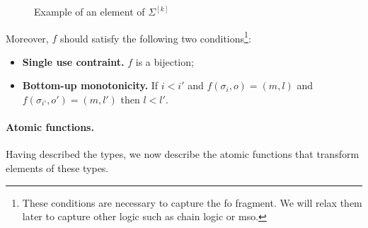 \begin{definition}[Types]
\begin{itemize}
\begin{enumerate}
\begin{figure}

\caption{Example of an element of $\Sigma^{[k]}$\label{FigMatrixPower}}
\end{figure}

Moreover, $f$ should satisfy the following two conditions\footnote{These conditions are necessary to capture the fo fragment. We will relax them later to capture other logic such as chain logic or mso.}:
\begin{itemize}
\item {\bf Single use contraint.} $f$ is a bijection;
\item  {\bf Bottom-up monotonicity.} If $i<i'$ and $f(\sigma_i, o)=(m,l)$ and $f(\sigma_{i'},o')=(m,l')$ then $l<l'$. 
\end{itemize}

%
    \end{enumerate}  
    \end{itemize}  
\end{definition}

\newcommand{\tensorpair}[2]{\langle #1, #2 \rangle}



\paragraph*{Atomic functions.} Having described the types, we now describe the atomic functions that transform elements of these types.




